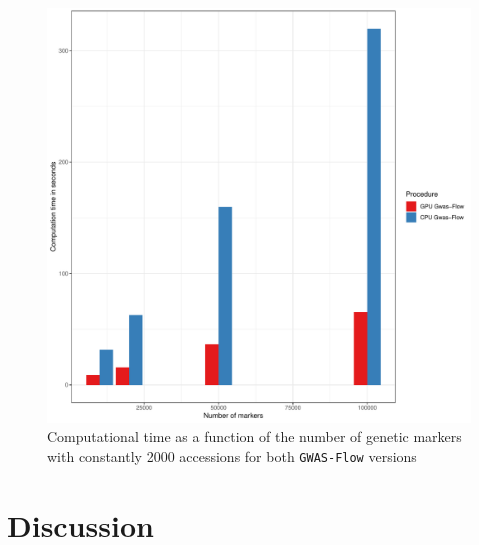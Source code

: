 \begin{figure}[H]
\centering
\includegraphics[height=.55\textheight, width=1.1\textwidth]{Figures/time_markers_gwas}
\decoRule
\caption[Computation time vs number of markers]{Computational time as a function of the number of genetic markers with constantly 2000 accessions for both \texttt{GWAS-Flow} versions}
\label{fig:time_marker}
\end{figure}

\section{Discussion}

